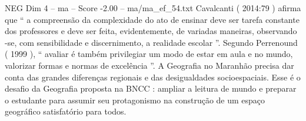 \begin{textsample}{NEG Dim 4 – ma – Score -2.00 – ma/ma\_ef\_54.txt}
Cavalcanti ( 2014:79 ) afirma que “ a compreensão da complexidade do ato de ensinar deve ser tarefa constante dos professores e deve ser feita, evidentemente, de variadas maneiras, observando -se, com sensibilidade e discernimento, a realidade escolar ”.
Segundo Perrenound ( 1999 ), “ avaliar é também privilegiar um modo de estar em aula e no mundo, valorizar formas e normas de excelência ”.
A Geografia no Maranhão precisa dar conta das grandes diferenças regionais e das desigualdades socioespaciais.
Esse é o desafio da Geografia proposta na BNCC : ampliar a leitura de mundo e preparar o estudante para assumir seu protagonismo na construção de um espaço geográfico satisfatório para todos.

\end{textsample}
